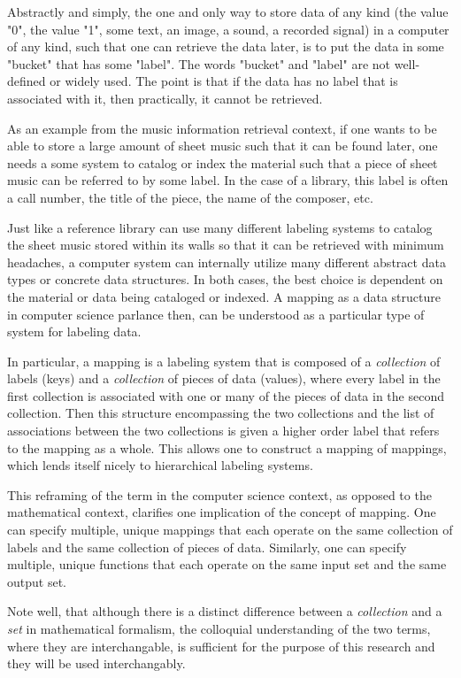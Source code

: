 Abstractly and simply, the one and only way to store data of any kind (the value "0", the value "1", some text, an image, a sound, a recorded signal) in a computer of any kind, such that one can retrieve the data later, is to put the data in some "bucket" that has some "label". The words "bucket" and "label" are not well-defined or widely used. The point is that if the data has no label that is associated with it, then practically, it cannot be retrieved. 

As an example from the music information retrieval context, if one wants to be able to store a large amount of sheet music such that it can be found later, one needs a some system to catalog or index the material such that a piece of sheet music can be referred to by some label. In the case of a library, this label is often a call number, the title of the piece, the name of the composer, etc.

Just like a reference library can use many different labeling systems to catalog the sheet music stored within its walls so that it can be retrieved with minimum headaches, a computer system can internally utilize many different abstract data types or concrete data structures. In both cases, the best choice is dependent on the material or data being cataloged or indexed. A mapping as a data structure in computer science parlance then, can be understood as a particular type of system for labeling data.

In particular, a mapping is a labeling system that is composed of a \emph{collection} of labels (keys) and a \emph{collection} of pieces of data (values), where every label in the first collection is associated with one or many of the pieces of data in the second collection. Then this structure encompassing the two collections and the list of associations between the two collections is given a higher order label that refers to the mapping as a whole. This allows one to construct a mapping of mappings, which lends itself nicely to hierarchical labeling systems.

This reframing of the term in the computer science context, as opposed to the mathematical context, clarifies one implication of the concept of mapping. One can specify multiple, unique mappings that each operate on the same collection of labels and the same collection of pieces of data. Similarly, one can specify multiple, unique functions that each operate on the same input set and the same output set. 

Note well, that although there is a distinct difference between a \emph{collection} and a \emph{set} in mathematical formalism, the colloquial understanding of the two terms, where they are interchangable, is sufficient for the purpose of this research and they will be used interchangably. 


